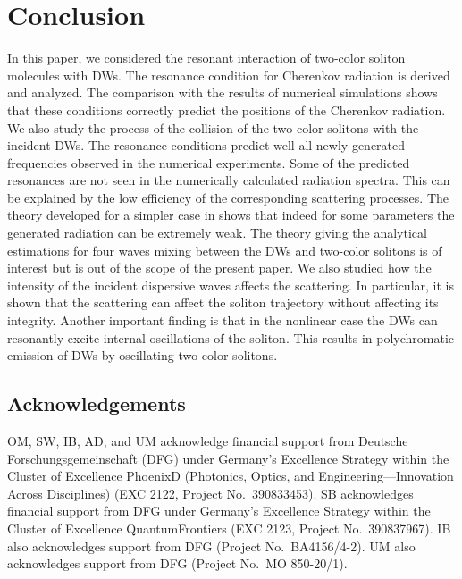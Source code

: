 \documentclass[aps, pra, twocolumn, superscriptaddress, final]{revtex4}
\begin{document}
\section{Conclusion\label{sec:conclusions}}

In this paper, we considered the resonant interaction of two-color soliton
molecules with DWs. The resonance condition for Cherenkov radiation is derived
and analyzed. The comparison with the results of numerical simulations shows
that these conditions correctly predict the positions of the Cherenkov
radiation. We also study the process of the collision of the two-color solitons
with the incident DWs. The resonance conditions predict well all newly
generated frequencies observed in the numerical experiments. Some of the
predicted resonances are not seen in the numerically calculated radiation
spectra. This can be explained by the low efficiency of the corresponding
scattering processes. The theory developed for a simpler case in
\cite{PhysRevE.72.016619} shows that indeed for some parameters the generated
radiation can be extremely weak. The theory giving the analytical estimations
for four waves mixing between the DWs and two-color solitons is of
interest but is out of the scope of the present paper. We also studied how the
intensity of the incident dispersive waves affects the scattering. In
particular, it is shown that the scattering can affect the soliton trajectory
without affecting its integrity. Another important finding is that in the
nonlinear case the DWs can resonantly excite internal oscillations
of the soliton. This results in polychromatic emission of DWs by
oscillating two-color solitons.

\subsection*{Acknowledgements}
OM, SW, IB, AD, and UM acknowledge financial support from Deutsche
Forschungsgemeinschaft (DFG) under Germany’s Excellence Strategy within the
Cluster of Excellence PhoenixD (Photonics, Optics, and Engineering—Innovation
Across Disciplines) (EXC 2122, Project No.\ 390833453).
%
SB acknowledges financial support from DFG under Germany's Excellence
Strategy within the Cluster of Excellence QuantumFrontiers (EXC 2123, Project
No.\ 390837967).
%
IB also acknowledges support from DFG (Project No.\ BA4156/4-2).
%
UM also acknowledges support from DFG (Project No.\ MO 850-20/1).
%



\end{document}

